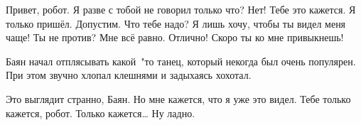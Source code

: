 \begin{dialog}
\X Привет, робот.
\R Я разве с тобой не говорил только что?
\X Нет! Тебе это кажется. Я только пришёл.
\R Допустим. Что тебе надо?
\X Я лишь хочу, чтобы ты видел меня чаще! Ты не против?
\R Мне всё равно.
\X Отлично! Скоро ты ко мне привыкнешь!
\end{dialog}

\begin{monolog}
Баян начал отплясывать какой~"то танец, который некогда был очень популярен. При этом звучно хлопал клешнями и задыхаясь хохотал. %
\end{monolog}

\begin{dialog}
\X Это выглядит странно, Баян. Но мне кажется, что я уже это видел.
\R Тебе только кажется, робот. Только кажется…
\X Ну ладно.
\end{dialog}